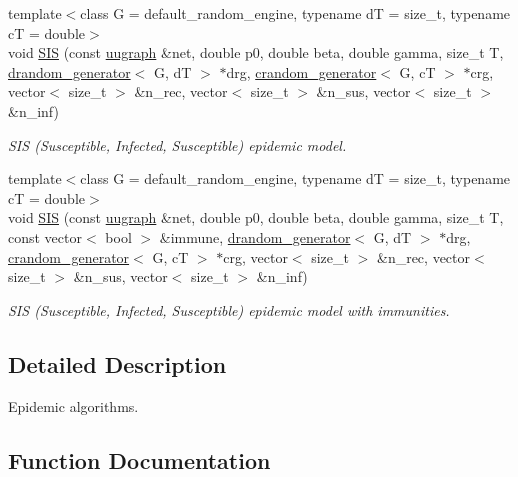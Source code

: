 \begin{DoxyCompactItemize}
{\footnotesize template$<$class G  = default\+\_\+random\+\_\+engine, typename dT  = size\+\_\+t, typename cT  = double$>$ }\\void \hyperlink{namespacelgraph_1_1networks_1_1epidemics_a642f9b0f7d197f3ab1ec5d8aa3ab9f06}{S\+IS} (const \hyperlink{classlgraph_1_1utils_1_1uugraph}{uugraph} \&net, double p0, double beta, double gamma, size\+\_\+t T, \hyperlink{classlgraph_1_1utils_1_1drandom__generator}{drandom\+\_\+generator}$<$ G, dT $>$ $\ast$drg, \hyperlink{classlgraph_1_1utils_1_1crandom__generator}{crandom\+\_\+generator}$<$ G, cT $>$ $\ast$crg, vector$<$ size\+\_\+t $>$ \&n\+\_\+rec, vector$<$ size\+\_\+t $>$ \&n\+\_\+sus, vector$<$ size\+\_\+t $>$ \&n\+\_\+inf)
\begin{DoxyCompactList}\small\item\em S\+IS (Susceptible, Infected, Susceptible) epidemic model. \end{DoxyCompactList}\item 
{\footnotesize template$<$class G  = default\+\_\+random\+\_\+engine, typename dT  = size\+\_\+t, typename cT  = double$>$ }\\void \hyperlink{namespacelgraph_1_1networks_1_1epidemics_a6ce4dff5c0a7b4451439092edfcbfc28}{S\+IS} (const \hyperlink{classlgraph_1_1utils_1_1uugraph}{uugraph} \&net, double p0, double beta, double gamma, size\+\_\+t T, const vector$<$ bool $>$ \&immune, \hyperlink{classlgraph_1_1utils_1_1drandom__generator}{drandom\+\_\+generator}$<$ G, dT $>$ $\ast$drg, \hyperlink{classlgraph_1_1utils_1_1crandom__generator}{crandom\+\_\+generator}$<$ G, cT $>$ $\ast$crg, vector$<$ size\+\_\+t $>$ \&n\+\_\+rec, vector$<$ size\+\_\+t $>$ \&n\+\_\+sus, vector$<$ size\+\_\+t $>$ \&n\+\_\+inf)
\begin{DoxyCompactList}\small\item\em S\+IS (Susceptible, Infected, Susceptible) epidemic model with immunities. \end{DoxyCompactList}\end{DoxyCompactItemize}


\subsection{Detailed Description}
Epidemic algorithms. 

\subsection{Function Documentation}
